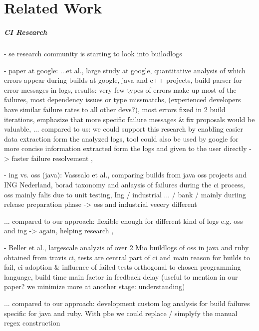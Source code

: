 \documentclass[\myrootdir/main.tex]{subfiles}
\begin{document}
\chapter{Related Work}
\paragraph{CI Research}
- se research community is starting to look into builodlogs

- paper at google: ...et al., large study at google, quantitative analysis of which errors appear during builds at google, java and c++ projects, build parser for error messages in logs, results: very few types of errors make up most of the failures, most dependency issues or type missmatchs, (experienced developers have similar failure rates to all other devs?), most errors fixed in 2 build iterations, emphasize that more specific failure messages \& fix proposals would be valuable,
... compared to us: we could support this research by enabling easier data extraction form the analyzed logs, tool could also be used by google for more concise information extracted form the logs and given to the user directly -> faster failure resolvement \cite{seo2014programmers},

- ing vs. oss (java): Vasssalo et al., comparing builds from java oss projects and ING Nederland, borad taxonomy and anlaysis of failures during the ci process, oss mainly falis due to unit testing, Ing / industrial ... / bank / mainly duriing release preparation phase -> oss and industrial veeery different

... compared to our approach: flexible enough for different kind of logs e.g. oss and ing -> again, helping research \cite{vassallo2017a-tale}, 


- Beller et al., largescale analyzis of over 2 Mio buildlogs of oss in java and ruby obtained from travis ci, tests are central part of ci and main reason for builds to fail, ci adoption \& influence of failed tests orthogonal to chosen programming language, build time main factor in feedback delay (useful to mention in our paper? we minimize more at another stage: understanding)

... compared to our approach: development custom log analysis for build failures specific for java and ruby. With pbe we could replace / simplyfy the manual regex construction\ \cite{beller2017oops}

\end{document}
